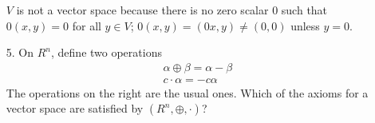 \documentclass{article}
\begin{document}
\begin{enumerate}[listparindent=\parindent]
\(V\) is not a vector space because there is no zero scalar \(0\) such that \(0(x, y) = 0\) for all \(y \in V\);
\(0(x, y) = (0x, y) \neq (0, 0)\) unless \(y = 0\).

\item[5.] On \(R^n\), define two operations
    \begin{gather*}
        \alpha \oplus \beta = \alpha - \beta \\
        c\cdot\alpha = -c\alpha
    \end{gather*}
    The operations on the right are the usual ones. Which of the axioms for a vector space are satisfied by \((R^n, \oplus, \cdot)\)?

\end{enumerate}
\end{document}
